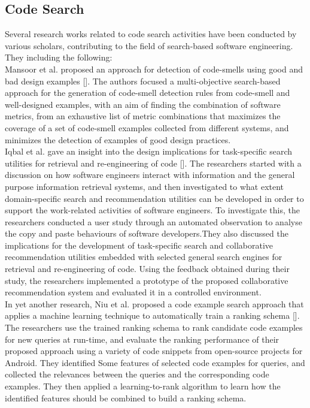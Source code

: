 \documentclass[a4paper]{article}
\begin{document}
\subsection{Code Search}
Several research works related to code search activities have been conducted by various scholars, contributing to the field of search-based software engineering. They including the following:\\
Mansoor et al. proposed an approach for detection of code-smells using good and bad design examples [].  The authors focused a multi-objective search-based approach for the generation of code-smell detection rules from code-smell and well-designed examples, with an aim of ﬁnding the combination of software metrics, from an exhaustive list of metric combinations that maximizes the coverage of a set of code-smell examples collected from different systems, and minimizes the detection of examples of good design practices.\\
Iqbal et al. gave an insight into the design implications for task-specific search utilities for retrieval and re-engineering of code []. The researchers started with a discussion on how software engineers interact with information and the general purpose information retrieval systems, and then investigated to what extent domain-specific search and recommendation utilities can be developed in order to support the work-related activities of software engineers. To investigate this, the researchers conducted a user study through an automated observation to analyse the copy and paste behaviours of software developers.They also discussed the implications for the development of task-specific search and collaborative recommendation utilities embedded with selected general search engines for retrieval and re-engineering of code. Using the feedback obtained during their study, the researchers implemented a prototype of the proposed collaborative recommendation system and evaluated it in a controlled environment.\\
In yet another research, Niu et al. proposed a code example search approach that applies a machine learning technique to automatically train a ranking schema []. The researchers use the trained ranking schema to rank candidate code examples for new queries at run-time, and evaluate the ranking performance of their proposed approach using a variety of code snippets from open-source projects for Android. They identified Some features of selected code examples for queries, and collected the relevances between the queries and the corresponding code examples. They then applied a learning-to-rank algorithm to learn how the identified features should be combined to build a ranking schema.\\
\end{document}
